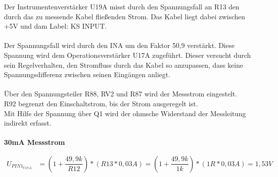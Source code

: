 Der Instrumentenverstärker U19A misst durch den Spannungsfall an R13 den durch das zu messende Kabel fließenden Strom. Das Kabel liegt dabei zwischen +5V und dam Label: KS INPUT.
\\
\\
Der Spannungsfall wird durch den INA um den Faktor 50,9 verstärkt. Diese Spannung wird dem Operationsverstärker U17A zugeführt. Dieser versucht durch sein Regelverhalten, den Stromfluss durch das Kabel so anzupassen, dass keine Spannungsdifferenz zwischen seinen Eingängen anliegt.
\\
\\
Über den Spannungsteiler R88, RV2 und R87 wird der Messstrom eingestelt. 
\\
R92 begrenzt den Einschaltstrom, bis der Strom ausgeregelt ist. 
\\
Mit Hilfe der Spannung über Q1 wird der ohmsche Widerstand der Messleitung indirekt erfasst.
\\
\\
\textbf{30mA Messstrom}
\\
\begin{center}
\begin{align*}
	U_{PIN1_{U17A}} &= (1 + \dfrac{49,9k}{R12}) * (R13 * 0,03A) = (1 + \dfrac{49,9k}{1k}) * (1R * 0,03A) = 1,53V
\end{align*} 
\end{center}


\newpage
